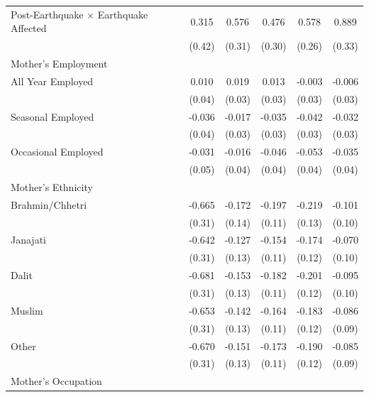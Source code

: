 \begin{longtable}{l*{5}{c}}
Post-Earthquake × Earthquake Affected & 0.315 & 0.576\sym{*} & 0.476 & 0.578\sym{**} & 0.889\sym{***} \\
                    & (0.42) & (0.31) & (0.30) & (0.26) & (0.33) \\
\multicolumn{6}{l}{Mother's Employment} \\
\hspace{1em}All Year Employed & 0.010 & 0.019 & 0.013 & -0.003 & -0.006 \\
                    & (0.04) & (0.03) & (0.03) & (0.03) & (0.03) \\
\hspace{1em}Seasonal Employed & -0.036 & -0.017 & -0.035 & -0.042 & -0.032 \\
                    & (0.04) & (0.03) & (0.03) & (0.03) & (0.03) \\
\hspace{1em}Occasional Employed & -0.031 & -0.016 & -0.046 & -0.053 & -0.035 \\
                    & (0.05) & (0.04) & (0.04) & (0.04) & (0.04) \\
\multicolumn{6}{l}{Mother's Ethnicity} \\
\hspace{1em}Brahmin/Chhetri & -0.665\sym{**} & -0.172 & -0.197\sym{*} & -0.219\sym{*} & -0.101 \\
                    & (0.31) & (0.14) & (0.11) & (0.13) & (0.10) \\
\hspace{1em}Janajati & -0.642\sym{**} & -0.127 & -0.154 & -0.174 & -0.070 \\
                    & (0.31) & (0.13) & (0.11) & (0.12) & (0.10) \\
\hspace{1em}Dalit & -0.681\sym{**} & -0.153 & -0.182\sym{*} & -0.201 & -0.095 \\
                    & (0.31) & (0.13) & (0.11) & (0.12) & (0.10) \\
\hspace{1em}Muslim & -0.653\sym{**} & -0.142 & -0.164 & -0.183 & -0.086 \\
                    & (0.31) & (0.13) & (0.11) & (0.12) & (0.09) \\
\hspace{1em}Other & -0.670\sym{**} & -0.151 & -0.173 & -0.190 & -0.085 \\
                    & (0.31) & (0.13) & (0.11) & (0.12) & (0.09) \\
\multicolumn{6}{l}{Mother's Occupation} \\

\end{longtable}
